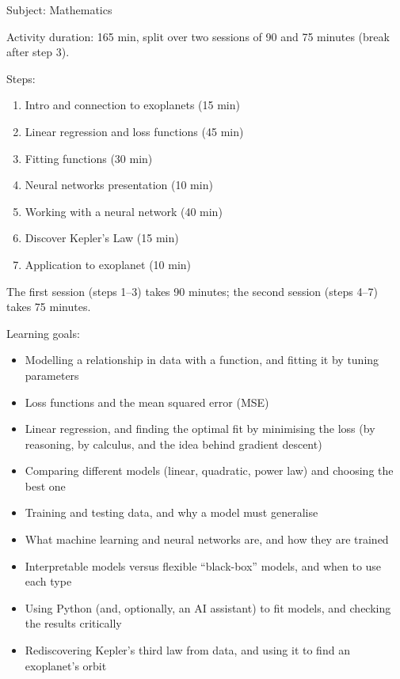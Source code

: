 \documentclass[12pt]{article}
\begin{document}
\vspace*{0.2\textheight}

Subject: Mathematics


\vspace{0.3cm}

Activity duration: 165 min, split over two sessions of 90 and 75 minutes (break after step 3).

\vspace{0.5cm}

Steps:
\begin{enumerate}
    \item Intro and connection to exoplanets (15 min)
    \item Linear regression and loss functions (45 min)
    \item Fitting functions (30 min)
    \item Neural networks presentation (10 min)
    \item Working with a neural network (40 min)
    \item Discover Kepler's Law (15 min)
    \item Application to exoplanet (10 min)
\end{enumerate}

\vspace{0.1cm}
The first session (steps 1--3) takes 90 minutes; the second session (steps 4--7) takes 75 minutes.

Learning goals:

\begin{itemize}
    \item Modelling a relationship in data with a function, and fitting it by tuning parameters
    \item Loss functions and the mean squared error (MSE)
    \item Linear regression, and finding the optimal fit by minimising the loss (by reasoning, by calculus, and the idea behind gradient descent)
    \item Comparing different models (linear, quadratic, power law) and choosing the best one
    \item Training and testing data, and why a model must generalise
    \item What machine learning and neural networks are, and how they are trained
    \item Interpretable models versus flexible ``black-box'' models, and when to use each type
    \item Using Python (and, optionally, an AI assistant) to fit models, and checking the results critically
    \item Rediscovering Kepler's third law from data, and using it to find an exoplanet's orbit
\end{itemize}
\end{document}
